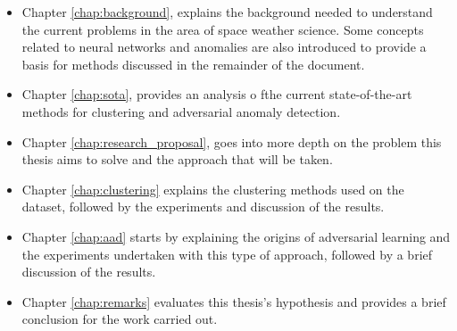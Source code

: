 \begin{itemize}
    \item Chapter \ref{chap:background}, explains the background needed to understand the current problems in the area of space weather science. Some concepts related to neural networks and anomalies are also introduced to provide a basis for methods discussed in the remainder of the document.

    \item Chapter \ref{chap:sota}, provides an analysis o fthe current state-of-the-art methods for clustering and adversarial anomaly detection.

    \item Chapter \ref{chap:research_proposal}, goes into more depth on the problem this thesis aims to solve and the approach that will be taken.


    \item Chapter \ref{chap:clustering} explains the clustering methods used on the dataset, followed by the experiments and discussion of the results.

    \item Chapter \ref{chap:aad} starts by explaining the origins of adversarial learning and the experiments undertaken with this type of approach, followed by a brief discussion of the results.

    \item Chapter \ref{chap:remarks} evaluates this thesis's hypothesis and provides a brief conclusion for the work carried out.
\end{itemize}

